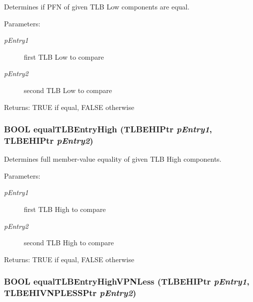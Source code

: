 Determines if PFN of given TLB Low components are equal. \begin{Desc}
\item[Parameters:]
\begin{description}
\item[{\em pEntry1}]first TLB Low to compare \item[{\em pEntry2}]second TLB Low to compare \end{description}
\end{Desc}
\begin{Desc}
\item[Returns:]TRUE if equal, FALSE otherwise \end{Desc}
\hypertarget{group___v_m_m___p_t_e_gb048909cf624c30137211a111e947112}{
\subsubsection[{equalTLBEntryHigh}]{\setlength{\rightskip}{0pt plus 5cm}BOOL equalTLBEntryHigh ({\bf TLBEHIPtr} {\em pEntry1}, \/  {\bf TLBEHIPtr} {\em pEntry2})}}
\label{group___v_m_m___p_t_e_gb048909cf624c30137211a111e947112}


Determines full member-value equality of given TLB High components. \begin{Desc}
\item[Parameters:]
\begin{description}
\item[{\em pEntry1}]first TLB High to compare \item[{\em pEntry2}]second TLB High to compare \end{description}
\end{Desc}
\begin{Desc}
\item[Returns:]TRUE if equal, FALSE otherwise \end{Desc}
\hypertarget{group___v_m_m___p_t_e_gd1c7bd735d03446658cc746c07187839}{
\subsubsection[{equalTLBEntryHighVPNLess}]{\setlength{\rightskip}{0pt plus 5cm}BOOL equalTLBEntryHighVPNLess ({\bf TLBEHIPtr} {\em pEntry1}, \/  {\bf TLBEHIVNPLESSPtr} {\em pEntry2})}}
\label{group___v_m_m___p_t_e_gd1c7bd735d03446658cc746c07187839}


